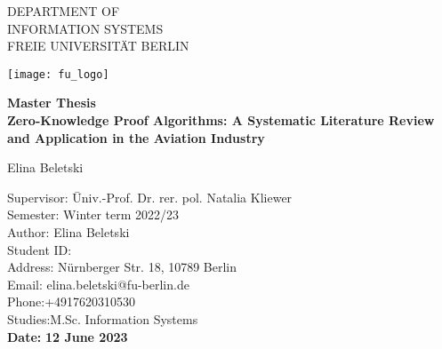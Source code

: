 \thispagestyle{empty}

\begin{center}

\vspace*{-10mm}

{\LARGE DEPARTMENT OF \\INFORMATION SYSTEMS\\[1mm]}
FREIE UNIVERSIT\"AT BERLIN\\

\vspace*{1cm}

\texttt{[image: fu\_logo]}

\vspace*{1cm}

{\Large \textbf{Master Thesis}}\\ 
\vspace{1cm}
{\Large \textbf{Zero-Knowledge Proof Algorithms: A Systematic Literature Review and Application in the Aviation Industry}}\\ 


\begin{comment}
{\Large \textbf{Hier folgt der Titel}}\\ 
\vspace*{1mm}
{\Large \textbf{dieser kann auf bis zu drei}}\\ 
\vspace*{1mm}
{\Large \textbf{Zeilen verteilt werden wenn n\"otig}}\\
\end{comment}
\vspace{1.5cm}

{\LARGE Elina Beletski}\\[15mm]

\parbox{120mm}
{
\begin{large}
\begin{tabbing}
Supervisor: \hspace{.7cm} \=Univ.-Prof. Dr. rer. pol. Natalia Kliewer\\[4mm]
Semester:\> Winter term 2022/23\\
Author:\> Elina Beletski\\ %
Student ID:\\
Address:\> N\"urnberger Str. 18, 10789 Berlin\\
Email:\> elina.beletski@fu-berlin.de\\
Phone:\>+4917620310530\\
Studies:\>M.Sc. Information Systems\\[8mm]
\textbf{Date:} \> \textbf{12 June 2023}\\
\end{tabbing}
\end{large}
}
\end{center}
\clearpage{\pagestyle{empty}\cleardoublepage}
